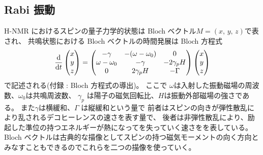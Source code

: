 \documentclass[11pt,dvipdfmx,a4paper]{jsarticle}
\begin{document}
\subsection{Rabi 振動}
H-NMR におけるスピンの量子力学的状態は Bloch ベクトル\(M = (x,\,y,\,z)\)で表され、
共鳴状態における Bloch ベクトルの時間発展は Bloch 方程式
\begin{equation}
	\dv{t}
	\begin{pmatrix}
		x\\ y\\ z
	\end{pmatrix}
	=
	\begin{pmatrix}
		-\gamma & -(\omega-\omega_0) & 0\\
		\omega -\omega_0 & -\gamma & -2\gamma_p H\\
		0 & 2\gamma_p H & -\Gamma
	\end{pmatrix}
	\begin{pmatrix}
		x\\ y\\ z
	\end{pmatrix}
\end{equation}
で記述される(付録 : Bloch 方程式の導出)。
ここで
\(\omega\)は入射した振動磁場の周波数、\(\omega_0\)は共鳴周波数、
\(\gamma_p\) は陽子の磁気回転比、\(H\)は振動外部磁場の強さである。
また\(\gamma\)は横緩和、\(\Gamma\) は縦緩和という量で
前者はスピンの向きが弾性散乱により乱されるデコヒーレンスの速さを表す量で、
後者は非弾性散乱により、励起した準位の持つエネルギーが熱になってを失っていく速さをを表している。
Bloch ベクトルは古典的な描像としてスピンの持つ磁気モーメントの向く方向とみなすこともできるのでこれらを二つの描像を使っていく。
\end{document}
